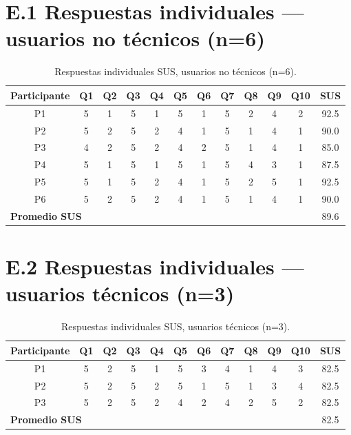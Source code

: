 \documentclass{iccmemoria}
\begin{document}
\section*{E.1 Respuestas individuales --- usuarios no técnicos (n=6)}

\begin{table}[H]
\centering
\begin{tabular}{|c|c|c|c|c|c|c|c|c|c|c|c|}
\hline
\textbf{Participante} & \textbf{Q1} & \textbf{Q2} & \textbf{Q3} & \textbf{Q4} & \textbf{Q5} & \textbf{Q6} & \textbf{Q7} & \textbf{Q8} & \textbf{Q9} & \textbf{Q10} & \textbf{SUS} \\
\hline
P1 & 5 & 1 & 5 & 1 & 5 & 1 & 5 & 2 & 4 & 2 & 92.5 \\
\hline
P2 & 5 & 2 & 5 & 2 & 4 & 1 & 5 & 1 & 4 & 1 & 90.0 \\
\hline
P3 & 4 & 2 & 5 & 2 & 4 & 2 & 5 & 1 & 4 & 1 & 85.0 \\
\hline
P4 & 5 & 1 & 5 & 1 & 5 & 1 & 5 & 4 & 3 & 1 & 87.5 \\
\hline
P5 & 5 & 1 & 5 & 2 & 4 & 1 & 5 & 2 & 5 & 1 & 92.5 \\
\hline
P6 & 5 & 2 & 5 & 2 & 4 & 1 & 5 & 1 & 4 & 1 & 90.0 \\
\hline
\multicolumn{11}{|l|}{\textbf{Promedio SUS}} & 89.6 \\
\hline
\end{tabular}
\caption{Respuestas individuales SUS, usuarios no técnicos (n=6).}
\label{tab:sus_notecnicos_individual}
\end{table}

\section*{E.2 Respuestas individuales --- usuarios técnicos (n=3)}

\begin{table}[H]
\centering
\begin{tabular}{|c|c|c|c|c|c|c|c|c|c|c|c|}
\hline
\textbf{Participante} & \textbf{Q1} & \textbf{Q2} & \textbf{Q3} & \textbf{Q4} & \textbf{Q5} & \textbf{Q6} & \textbf{Q7} & \textbf{Q8} & \textbf{Q9} & \textbf{Q10} & \textbf{SUS} \\
\hline
P1 & 5 & 2 & 5 & 1 & 5 & 3 & 4 & 1 & 4 & 3 & 82.5 \\
\hline
P2 & 5 & 2 & 5 & 2 & 5 & 1 & 5 & 1 & 3 & 4 & 82.5 \\
\hline
P3 & 5 & 2 & 5 & 2 & 4 & 2 & 4 & 2 & 5 & 2 & 82.5 \\
\hline
\multicolumn{11}{|l|}{\textbf{Promedio SUS}} & 82.5 \\
\hline
\end{tabular}
\caption{Respuestas individuales SUS, usuarios técnicos (n=3).}
\label{tab:sus_tecnicos_individual}
\end{table}
\end{document}
